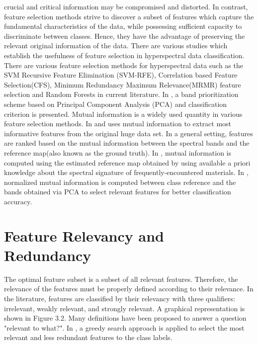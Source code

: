 \documentclass[document.tex]{subfiles}
\begin{document}
crucial and critical information may be compromised and distorted. In contrast, feature
selection methods strive to discover a subset of features which capture the fundamental
characteristics of the data, while possessing sufficient capacity to discriminate between
classes. Hence, they have the advantage of preserving the relevant original information of
the data. There are various studies which establish the usefulness of feature selection in
hyperspectral data classification. There are various feature selection methods for hyperspectral data such as the SVM Recursive Feature Elimination (SVM-RFE), Correlation
based Feature Selection(CFS), Minimum Redundancy Maximum Relevance(MRMR)
\cite{14} feature selection and Random Forests\cite{15} in current literature. In \cite{5}, a band prioritization scheme based
on Principal Component Analysis (PCA) and classification criterion is presented. Mutual
information is a widely used quantity in various feature selection methods. In \cite{16} and \cite{17} uses mutual information to extract most informative features from the original huge data set. In a general
setting, features are ranked based on the mutual information between the spectral bands
and the reference map(also known as the ground truth). In \cite{10}, mutual information is
computed using the estimated reference map obtained by using available a priori knowledge about the spectral signature of frequently-encountered materials. In \cite{9}, normalized mutual information is computed between class reference and the bands obtained via PCA to select relevant features for better classification accuracy.  

\section{Feature Relevancy and Redundancy}
The optimal feature subset is a subset of all relevant features. Therefore, the relevance
of the features must be properly defined according to their relevance. In the literature,
features are classified by their relevancy with three qualifiers: irrelevant, weakly relevant,
and strongly relevant. A graphical representation is shown in Figure 3.2. Many definitions
have been proposed to answer a question "relevant to what?". In \cite{9}, a greedy search approach is applied to select the most relevant and less redundant features to the class labels. 
\end{document}

